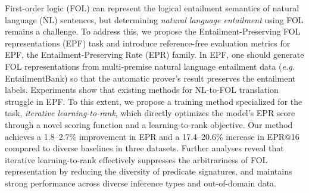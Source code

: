 First-order logic (FOL) can represent the logical entailment semantics of natural language (NL) sentences, but determining \textit{natural language entailment} using FOL remains a challenge. To address this, we propose the Entailment-Preserving FOL representations (EPF) task and introduce reference-free evaluation metrics for EPF, the Entailment-Preserving Rate (EPR) family. In EPF, one should generate FOL representations from multi-premise natural language entailment data (\textit{e.g.} EntailmentBank) so that the automatic prover's result preserves the entailment labels. Experiments show that existing methods for NL-to-FOL translation struggle in EPF. To this extent, we propose a training method specialized for the task, \textit{iterative learning-to-rank}, which directly optimizes the model’s EPR score through a novel scoring function and a learning-to-rank objective. Our method achieves a 1.8–2.7\% improvement in EPR and a 17.4–20.6\% increase in EPR@16 compared to diverse baselines in three datasets.
Further analyses reveal that iterative learning-to-rank effectively suppresses the arbitrariness of FOL representation by reducing the diversity of predicate signatures, and maintains strong performance across diverse inference types and out-of-domain data.
